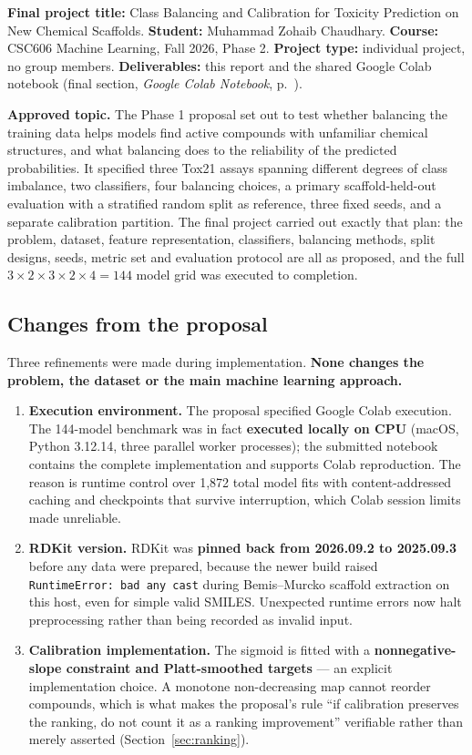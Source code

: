 \documentclass[10pt,letterpaper]{article}
\begin{document}
\noindent
\textbf{Final project title:} Class Balancing and Calibration for Toxicity Prediction on New
Chemical Scaffolds. \quad\textbf{Student:} Muhammad Zohaib Chaudhary. \quad\textbf{Course:} CSC606
Machine Learning, Fall 2026, Phase 2. \quad\textbf{Project type:} individual project, no group
members. \quad\textbf{Deliverables:} this report and the shared Google Colab notebook (final
section, \emph{Google Colab Notebook}, p.~\pageref{sec:colab}).

\textbf{Approved topic.} The Phase 1 proposal set out to test whether balancing the training data
helps models find active compounds with unfamiliar chemical structures, and what balancing does to
the reliability of the predicted probabilities. It specified three Tox21 assays spanning different
degrees of class imbalance, two classifiers, four balancing choices, a primary scaffold-held-out
evaluation with a stratified random split as reference, three fixed seeds, and a separate
calibration partition. The final project carried out exactly that plan: the problem, dataset,
feature representation, classifiers, balancing methods, split designs, seeds, metric set and
evaluation protocol are all as proposed, and the full $3\times2\times3\times2\times4=144$ model grid
was executed to completion.

\subsection{Changes from the proposal}
\label{sec:departures}

Three refinements were made during implementation. \textbf{None changes the problem, the dataset or
the main machine learning approach.}

\begin{enumerate}\setlength{\itemsep}{1pt}
\item \textbf{Execution environment.} The proposal specified Google Colab execution. The 144-model
benchmark was in fact \textbf{executed locally on CPU} (macOS, Python 3.12.14, three parallel worker
processes); the submitted notebook contains the complete implementation and supports Colab
reproduction. The reason is runtime control over 1{,}872 total model fits with content-addressed
caching and checkpoints that survive interruption, which Colab session limits made unreliable.
\item \textbf{RDKit version.} RDKit was \textbf{pinned back from 2026.09.2 to 2025.09.3} before any
data were prepared, because the newer build raised \texttt{RuntimeError: bad any cast} during
Bemis--Murcko scaffold extraction on this host, even for simple valid SMILES. Unexpected runtime
errors now halt preprocessing rather than being recorded as invalid input.
\item \textbf{Calibration implementation.} The sigmoid is fitted with a \textbf{nonnegative-slope
constraint and Platt-smoothed targets} --- an explicit implementation choice. A monotone
non-decreasing map cannot reorder compounds, which is what makes the proposal's rule ``if
calibration preserves the ranking, do not count it as a ranking improvement'' verifiable rather
than merely asserted (Section~\ref{sec:ranking}).
\end{enumerate}
\end{document}
